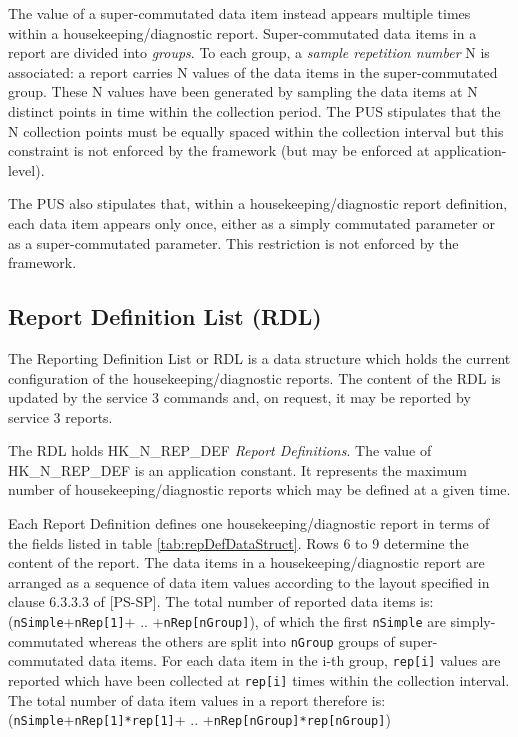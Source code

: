 \documentclass{pnp_article}
\begin{document}
The value of a super-commutated data item instead appears multiple times within a housekeeping/diagnostic report. Super-commutated data items in a report are divided into \textit{groups}. To each group, a \textit{sample repetition number} N is associated: a report carries N values of the data items in the super-commutated group. These N values have been generated by sampling the data items at N distinct points in time within the collection period. The PUS stipulates that the N collection points must be equally spaced within the collection interval but this constraint is not enforced by the framework (but may be enforced at application-level). 

The PUS also stipulates that, within a housekeeping/diagnostic report definition, each data item appears only once, either as a simply commutated parameter or as a super-commutated parameter. This restriction is not enforced by the framework.

\subsection{Report Definition List (RDL)}\label{sec:serv3RDL}
The Reporting Definition List or RDL is a data structure which holds the current configuration of the housekeeping/diagnostic reports. The content of the RDL is updated by the service 3 commands and, on request, it may be reported by service 3 reports.

The RDL holds HK\_N\_REP\_DEF \textit{Report Definitions}. The value of HK\_N\_REP\_DEF is an application constant. It represents the maximum number of housekeeping/diagnostic reports which may be defined at a given time. 

Each Report Definition defines one housekeeping/diagnostic report in terms of the fields listed in table \ref{tab:repDefDataStruct}. Rows 6 to 9 determine the content of the report. The data items in a housekeeping/diagnostic report are arranged as a sequence of data item values according to the layout specified in clause 6.3.3.3 of [PS-SP]. The total number of reported data items is: (\texttt{nSimple}+\texttt{nRep[1]}+ .. +\texttt{nRep[nGroup]}), of which the first \texttt{nSimple} are simply-commutated whereas the others are split into \texttt{nGroup} groups of super-commutated data items. For each data item in the i-th group, \texttt{rep[i]} values are reported which have been collected at \texttt{rep[i]} times within the collection interval. The total number of data item values in a report therefore is: (\texttt{nSimple}+\texttt{nRep[1]*rep[1]}+ .. +\texttt{nRep[nGroup]*rep[nGroup]})
\end{document}
